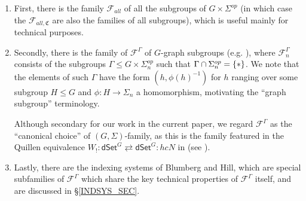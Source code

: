 \documentclass[a4paper,10pt
,draft
]{article}%
\numberwithin{equation}{section}
\numberwithin{figure}{section}
\theoremstyle{definition} %
\newcommand{\F}{\ensuremath{\mathcal F}}
\newcommand{\1}{\ensuremath{\mathbbm 1}}%
\begin{document}
\begin{enumerate}[label = (\alph*)]
	\item First, there is the family $\F_{all}$ of all the subgroups of $G \times \Sigma^{op}$
	(in which case the $\F_{all,\mathfrak{C}}$ are also the families of all subgroups), which is useful mainly for technical purposes.
	
	\item Secondly, there is the family of $\F^{\Gamma}$
	of $G$-graph subgroups (e.g. \cite[Def. 6.36]{BP_geo}),
	where $\F^{\Gamma}_n$ consists of the subgroups
	$\Gamma \leq G \times \Sigma_n^{op}$
	such that $\Gamma \cap \Sigma_n^{op} = \{\**\}$.
	We note that the elements of such $\Gamma$
	have the form $(h,\phi(h)^{-1})$
	for $h$ ranging over some subgroup $H \leq G$
	and $\phi \colon H \to \Sigma_n$
	a homomorphism,
	motivating the ``graph subgroup'' terminology.
	
	Although secondary for our work in the current paper, we regard $\F^{\Gamma}$ as the ``canonical choice'' of
	$(G,\Sigma)$-family, 
	as this is the family featured in the Quillen equivalence
	$W_! \colon 
	\mathsf{dSet}^G \rightleftarrows 
	\mathsf{dSet}^G \colon hcN$
	in \cite[Thm. I]{BP_TAS} 
	(see \cite[Equation \eqref{AC-BPMAINTHM_EQ}]{BP_ACOP}).
	
	\item Lastly, there are the indexing systems of Blumberg and Hill,
	which are special subfamilies of $\F^{\Gamma}$
	which share the key technical properties of 
	$\F^{\Gamma}$ itself,
	and are discussed in \S \ref{INDSYS_SEC}.
\end{enumerate}
\end{document}
